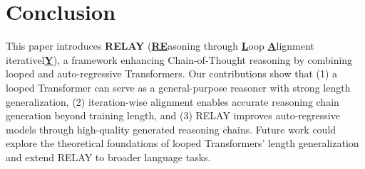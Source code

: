 \section{Conclusion}

This paper introduces \textbf{RELAY} (\underline{\textbf{RE}}asoning through \underline{\textbf{L}}oop \underline{\textbf{A}}lignment iterativel\underline{\textbf{Y}}), a framework enhancing Chain-of-Thought reasoning by combining looped and auto-regressive Transformers. Our contributions show that (1) a looped Transformer can serve as a general-purpose reasoner with strong length generalization, (2) iteration-wise alignment enables accurate reasoning chain generation beyond training length, and (3) RELAY improves auto-regressive models through high-quality generated reasoning chains. Future work could explore the theoretical foundations of looped Transformers' length generalization and extend RELAY to broader language tasks.




